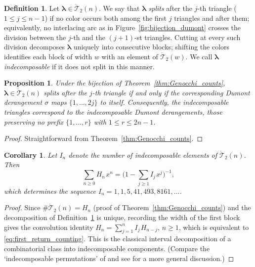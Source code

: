 \documentclass[pdftex]{sigma}
\numberwithin{equation}{section}
\newcommand{\ssp}{\hspace{1pt}}
\newtheorem{Corollary}[Theorem]{Corollary}
\newtheorem{Proposition}[Theorem]{Proposition}
\theoremstyle{definition}
\newtheorem{Definition}[Theorem]{Definition}
\begin{document}
\begin{Definition}
	\label{def:indecomposable_triangle}
	Let $\boldsymbol\lambda\in\mathring{\mathcal{T}}_2(n)$.
	We say that $\boldsymbol\lambda$ \emph{splits} after the $j$-th triangle
	($1\le j\le n-1$) if no color occurs both among the first $j$ triangles
	and after them; equivalently, no interlacing arc as in
	Figure~\ref{fig:bijection_dumont} crosses the division between the $j$-th and
	the $(j+1)$-st triangles.
	Cutting at every such division decomposes $\boldsymbol\lambda$ uniquely
	into consecutive blocks; shifting the colors identifies each block of
	width $w$ with an element of $\mathring{\mathcal{T}}_2(w)$.
	We call $\boldsymbol\lambda$ \emph{indecomposable} if it does not split
	in this manner.
\end{Definition}

\begin{Proposition}
	\label{prop:splits_direct_sum}
	Under the bijection of Theorem~{\rm \ref{thm:Genocchi_counts}},
	$\boldsymbol\lambda\in\mathring{\mathcal{T}}_2(n)$ splits after the
	$j$-th triangle if and only if the corresponding Dumont derangement
	$\sigma$ maps $\{1,\dots,2j\}$ to itself. Consequently, the indecomposable triangles correspond to the
	\emph{indecomposable} Dumont derangements, those preserving no
	prefix $\{1,\dots,r\}$ with $1\le r\le 2n-1$.
\end{Proposition}
\begin{proof}
	Straightforward from Theorem~\ref{thm:Genocchi_counts}.
\end{proof}

\begin{Corollary}
	\label{cor:indecomposable_count}
	Let $I_n$ denote the number of indecomposable elements of
	$\mathring{\mathcal{T}}_2(n)$.
	Then
	\begin{equation}
		\label{eq:first_return_counting}
		\sum_{n\ge0} H_n\ssp x^n=\biggl(1-\sum_{j\ge1} I_j\ssp
		x^j\biggr)^{-1},
	\end{equation}
	which determines the sequence $I_n=1,1,5,41,493,8161,\dots$.
\end{Corollary}
\begin{proof}
	Since $\#\mathring{\mathcal{T}}_2(n)=H_n$ (proof of
	Theorem~\ref{thm:Genocchi_counts}) and the decomposition of
	Definition~\ref{def:indecomposable_triangle} is unique, recording the width of the
	first block gives the convolution identity
	$H_n=\sum_{j=1}^{n} I_j\ssp H_{n-j}$, $n\ge1$, which is equivalent to
	\eqref{eq:first_return_counting}.
	This is the classical interval decomposition of a
	combinatorial class into indecomposable components. (Compare the
	`indecomposable permutations' of \cite{Comtet1972} and see
	\cite{Beissinger1985} for a more general discussion.)
\end{proof}
\end{document}
